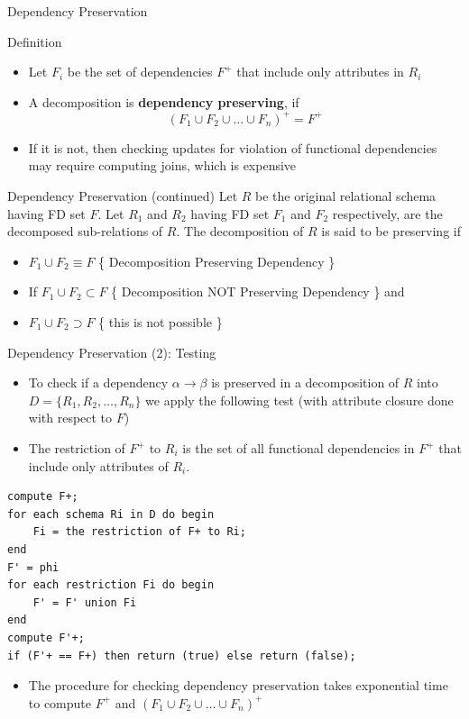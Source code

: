 \documentclass[aspectratio=169, xcolor=dvipsnames]{beamer}
\begin{document}
\begin{frame}{Dependency Preservation}
    \begin{block}{Definition}
        \begin{itemize}[<+->]
            \item Let $F_i$ be the set of dependencies $F^+$ that include only attributes in $R_i$
            \item A decomposition is \textbf{dependency preserving}, if
            \[ (F_1 \cup F_2 \cup \dots \cup F_n)^+ = F^+ \]
            \item If it is not, then checking updates for violation of functional dependencies may require computing joins, which is expensive
        \end{itemize}
    \end{block}
\end{frame}

\begin{frame}{Dependency Preservation (continued)}
    Let $R$ be the original relational schema having FD set $F$. Let $R_1$ and $R_2$ having FD set $F_1$ and $F_2$ respectively, are the decomposed sub-relations of $R$. The decomposition of $R$ is said to be preserving if
    \begin{itemize}[<+->]
        \item $F_1 \cup F_2 \equiv F$ \{ Decomposition Preserving Dependency \}
        \item If $F_1 \cup F_2 \subset F$ \{ Decomposition NOT Preserving Dependency \} and
        \item $F_1 \cup F_2 \supset F$ \{ this is not possible \}
    \end{itemize}
\end{frame}

\begin{frame}[fragile]{Dependency Preservation (2): Testing}
    \begin{itemize}[<+->]
        \item To check if a dependency $\alpha \rightarrow \beta$ is preserved in a decomposition of $R$ into $D = \{R_1, R_2, \dots, R_n\}$ we apply the following test (with attribute closure done with respect to $F$)
        \item The restriction of $F^+$ to $R_i$ is the set of all functional dependencies in $F^+$ that include only attributes of $R_i$.
    \end{itemize}
    \vspace{0.5em}
    \begin{verbatim}
compute F+;
for each schema Ri in D do begin
    Fi = the restriction of F+ to Ri;
end
F' = phi
for each restriction Fi do begin
    F' = F' union Fi
end
compute F'+;
if (F'+ == F+) then return (true) else return (false);
    \end{verbatim}
    \begin{itemize}[<+(2)->]
        \item The procedure for checking dependency preservation takes exponential time to compute $F^+$ and $(F_1 \cup F_2 \cup \dots \cup F_n)^+$
    \end{itemize}
\end{frame}
\end{document}
